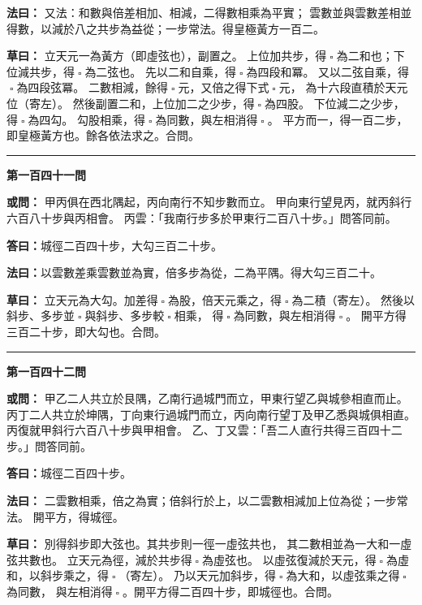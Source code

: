 \documentclass[11pt,a4paper]{article}
\let\origsquare\square
\renewcommand{\square}{\ensuremath{\origsquare}}%
\newcommand{\longline}{\noindent\rule{\textwidth}{0.4pt}}
\newcommand{\owen}[1]{%
  \par\vspace{0.4em}%
  \noindent\textcolor{problemcolor}{\textbf{或問：}}{\tradfont #1}\par\nopagebreak%
}
\newcommand{\fayue}[1]{%
  \par\noindent\textcolor{methodcolor}{\textbf{法曰：}}{\tradfont #1}\par\nopagebreak%
}
\newcommand{\tsaoyue}[1]{%
  \par\noindent\textcolor{workcolor}{\textbf{草曰：}}{\tradfont #1}\par%
}
\newcommand{\dayue}[1]{%
  \par\noindent\textcolor{anscolor}{\textbf{答曰：}}{\tradfont #1}\par\nopagebreak%
}
\newcommand{\wen}[1]{\par\vspace{0.3em}\noindent\textcolor{problemcolor}{\textbf{第#1問}}\par}
\begin{document}
\fayue{%
又法：和數與倍差相加、相減，二得數相乘為平實；
雲數並與雲數差相並得數，以減於八之共步為益從；一步常法。得皇極黃方一百二。}

\tsaoyue{%
立天元一為黃方（即虛弦也），副置之。
上位加共步，得$ \; \square \; $為二和也；下位減共步，得$ \; \square \; $為二弦也。
先以二和自乘，得$ \; \square \; $為四段和冪。
又以二弦自乘，得$ \; \square \; $為四段弦冪。
二數相減，餘得$ \; \square \; $元，又倍之得下式$ \; \square \; $元，
為十六段直積於天元位（寄左）。
然後副置二和，上位加二之少步，得$ \; \square \; $為四股。
下位減二之少步，得$ \; \square \; $為四勾。
勾股相乘，得$ \; \square \; $為同數，與左相消得$ \; \square \; $。
平方而一，得一百二步，即皇極黃方也。餘各依法求之。合問。}

\vspace{0.5cm}
\begin{center}
\longline
\end{center}

\wen{一百四十一}
\owen{%
甲丙俱在西北隅起，丙向南行不知步數而立。
甲向東行望見丙，就丙斜行六百八十步與丙相會。
丙雲：「我南行步多於甲東行二百八十步。」問答同前。}
\dayue{城徑二百四十步，大勾三百二十步。}

\fayue{以雲數差乘雲數並為實，倍多步為從，二為平隅。得大勾三百二十。}

\tsaoyue{%
立天元為大勾。加差得$ \; \square \; $為股，倍天元乘之，得$ \; \square \; $為二積（寄左）。
然後以斜步、多步並$ \; \square \; $與斜步、多步較$ \; \square \; $相乘，
得$ \; \square \; $為同數，與左相消得$ \; \square \; $。
開平方得三百二十步，即大勾也。合問。}

\vspace{0.5cm}
\begin{center}
\longline
\end{center}

\wen{一百四十二}
\owen{%
甲乙二人共立於艮隅，乙南行過城門而立，甲東行望乙與城參相直而止。
丙丁二人共立於坤隅，丁向東行過城門而立，丙向南行望丁及甲乙悉與城俱相直。
丙復就甲斜行六百八十步與甲相會。
乙、丁又雲：「吾二人直行共得三百四十二步。」問答同前。}
\dayue{城徑二百四十步。}

\fayue{%
二雲數相乘，倍之為實；倍斜行於上，以二雲數相減加上位為從；一步常法。
開平方，得城徑。}

\tsaoyue{%
別得斜步即大弦也。其共步則一徑一虛弦共也，
其二數相並為一大和一虛弦共數也。
立天元為徑，減於共步得$ \; \square \; $為虛弦也。
以虛弦復減於天元，得$ \; \square \; $為虛和，以斜步乘之，得$ \; \square \; $（寄左）。
乃以天元加斜步，得$ \; \square \; $為大和，以虛弦乘之得$ \; \square \; $為同數，
與左相消得$ \; \square \; $。開平方得二百四十步，即城徑也。合問。}
\end{document}
